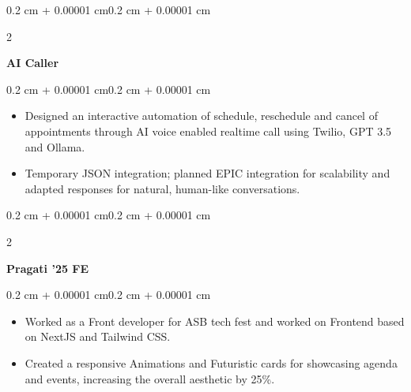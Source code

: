 \documentclass[10pt, letterpaper]{article}
\newenvironment{highlights}{
    \begin{itemize}[topsep=0.10 cm, parsep=0.10 cm, partopsep=0pt, itemsep=0pt, leftmargin=0.4 cm + 10pt]
}{
    \end{itemize}
}
\newenvironment{onecolentry}{
    \begin{adjustwidth}{0.2 cm + 0.00001 cm}{0.2 cm + 0.00001 cm}
}{
    \end{adjustwidth}
}
\newenvironment{twocolentry}[2][]{
    \onecolentry
    \def\secondColumn{#2}
    \setcolumnwidth{\fill, 4.5 cm}
    \begin{paracol}{2}
}{
    \switchcolumn \raggedleft \secondColumn
    \end{paracol}
    \endonecolentry
}
\let\hrefWithoutArrow\href
\renewcommand{\href}[2]{\hrefWithoutArrow{#1}{\ifthenelse{\equal{#2}{}}{ }{#2 }\raisebox{.15ex}{\footnotesize \faExternalLink*}}}
\begin{document}
        \vspace{0.2 cm}
        \begin{twocolentry}{
            \textit{\href{https://www.canva.com/design/DAGcWHPQOqg/_yFSd-mJ9OkrKTgNpLnC_g/edit?utm_content=DAGcWHPQOqg&utm_campaign=designshare&utm_medium=link2&utm_source=sharebutton}{Link}}}
            \textbf{AI Caller}
        \end{twocolentry}
        \vspace{0.10 cm}
        \begin{onecolentry}
            \begin{highlights}
                \item Designed an interactive automation of schedule, reschedule and cancel of appointments through AI voice enabled realtime call using Twilio, GPT 3.5 and Ollama.
                \item Temporary JSON integration; planned EPIC integration for scalability and adapted responses for natural, human-like conversations.
            \end{highlights}
        \end{onecolentry}
        
        \vspace{0.2 cm}
        \begin{twocolentry}{
            \textit{\href{https://pragati.amrita.edu/}{Link}}}
            \textbf{Pragati '25 FE}
        \end{twocolentry}
        \vspace{0.10 cm}
        \begin{onecolentry}
            \begin{highlights}
                \item Worked as a Front developer for ASB tech fest and worked on Frontend based on NextJS and Tailwind CSS.
                \item Created a responsive Animations and Futuristic cards for showcasing agenda and events, increasing the overall aesthetic by 25\%.
            \end{highlights}
        \end{onecolentry}
\end{document}
